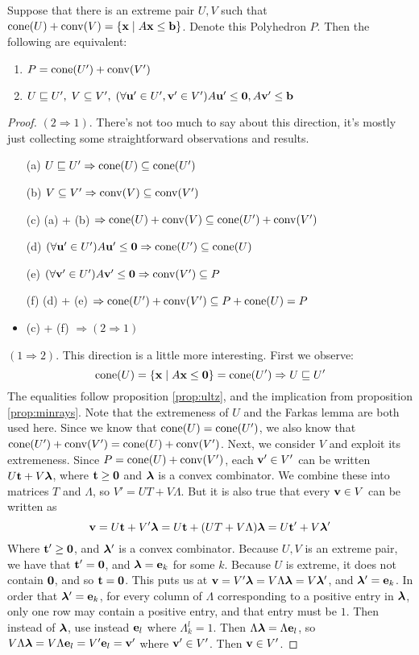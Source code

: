 \begin{Prop}{\label{prop:hpolytest}
  Suppose that there is an extreme pair $U,V$ such that $\operatorname{cone}(U) + \operatorname{conv}(V) = \left\{\mathbf{x}\;|\; A\mathbf{x}\leq\mathbf{b}\right\}$.  Denote this Polyhedron $P$.  Then the following are equivalent:
\begin{enumerate}
  \item $P = \operatorname{cone}(U') + \operatorname{conv}(V')$
  \item $U \sqsubseteq U',\; V \subseteq V',\; 
        (\forall \mathbf{u}'\in U',\mathbf{v}'\in V') A\mathbf{u}'\leq\mathbf{0}, A\mathbf{v}'\leq\mathbf{b}$
\end{enumerate}
}\end{Prop}

\begin{proof}
$(2 \Rightarrow 1)$.  There's not too much to say about this direction, it's mostly just collecting some straightforward observations and results.
\begin{itemize}
  \item[(a)] $U \sqsubseteq U' \Rightarrow \operatorname{cone}(U) \subseteq \operatorname{cone}(U')$  
  \item[(b)] $V \subseteq V' \Rightarrow \operatorname{conv}(V) \subseteq \operatorname{conv}(V')$
  \item[(c)] (a) + (b) $\Rightarrow \operatorname{cone}(U)+\operatorname{conv}(V) \subseteq \operatorname{cone}(U') + \operatorname{conv}(V')$
  \item[(d)] $(\forall \mathbf{u}'\in U') A\mathbf{u}' \leq \mathbf{0} \Rightarrow \operatorname{cone}(U') \subseteq \operatorname{cone}(U)$
  \item[(e)] $(\forall \mathbf{v}'\in U') A\mathbf{v}' \leq \mathbf{0} \Rightarrow \operatorname{conv}(V') \subseteq P$
  \item[(f)] (d) + (e) $\Rightarrow \operatorname{cone}(U') + \operatorname{conv}(V') \subseteq P + \operatorname{cone}(U) = P$
  \item (c) + (f) $\Rightarrow (2 \Rightarrow 1)$
\end{itemize}

$(1 \Rightarrow 2)$.  This direction is a little more interesting.  First we observe:
\[ \operatorname{cone}(U) = \left\{\mathbf{x}\;|\; A\mathbf{x}\leq\mathbf{0}\right\} = \operatorname{cone}(U') \Rightarrow U \sqsubseteq U' \]
The equalities follow proposition \ref{prop:ultz}, and the implication from proposition \ref{prop:minrays}.  Note that the extremeness of $U$ and the Farkas lemma are both used here.  Since we know that $\operatorname{cone}(U) = \operatorname{cone}(U')$, we also know that $\operatorname{cone}(U') + \operatorname{conv}(V') = \operatorname{cone}(U) + \operatorname{conv}(V')$.  Next, we consider $V$ and exploit its extremeness.  Since $P = \operatorname{cone}(U) + \operatorname{conv}(V')$, each $\mathbf{v}'\in V'$ can be written $U\mathbf{t} + V\bm{\lambda}$, where $\mathbf{t} \geq \mathbf{0}$ and $\bm{\lambda}$ is a convex combinator.  We combine these into matrices $T$ and $\Lambda$, so $V' = UT + V\Lambda$.  But it is also true that every $\mathbf{v}\in V$ can be written as 
  \[ \mathbf{v} = U\mathbf{t} + V'\bm{\lambda} = U\mathbf{t} + (UT + V\Lambda)\bm{\lambda} = U\mathbf{t}' + V\bm{\lambda}' \]
Where $\mathbf{t}'\geq\mathbf{0}$, and $\bm{\lambda}'$ is a convex combinator.  Because $U,V$ is an extreme pair, we have that $\mathbf{t}'=\mathbf{0}$, and $\bm{\lambda} = \mathbf{e}_k$ for some $k$.  Because $U$ is extreme, it does not contain $\mathbf{0}$, and so $\mathbf{t} = \mathbf{0}$.  This puts us at $\mathbf{v} = V'\bm{\lambda} = V\Lambda\bm{\lambda} = V\bm{\lambda}'$, and $\bm{\lambda}' = \mathbf{e}_k$.  In order that $\bm{\lambda}' = \mathbf{e}_k$, for every column of $\Lambda$ corresponding to a positive entry in $\bm{\lambda}$, only one row may contain a positive entry, and that entry must be $1$.  Then instead of $\bm{\lambda}$, use instead $\mathbf{e}_l$ where $\Lambda_k^l = 1$.  Then $\Lambda\bm{\lambda} = \Lambda\mathbf{e}_l$, so $V\Lambda\bm{\lambda} = V\Lambda\mathbf{e}_l = V'\mathbf{e}_l=\mathbf{v}'$ where $\mathbf{v}'\in V'$.  Then $\mathbf{v} \in V'$.


\end{proof}
